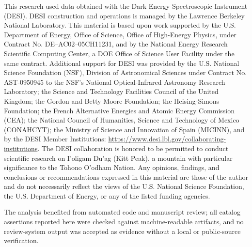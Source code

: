 \documentclass[twocolumn]{aastex701}
\begin{document}
\begin{acknowledgments}
This research used data obtained with the Dark Energy Spectroscopic Instrument (DESI).  DESI
construction and operations is managed by the Lawrence Berkeley National Laboratory.  This
material is based upon work supported by the U.S. Department of Energy, Office of Science,
Office of High-Energy Physics, under Contract No. DE--AC02--05CH11231, and by the National Energy
Research Scientific Computing Center, a DOE Office of Science User Facility under the same
contract.  Additional support for DESI was provided by the U.S. National Science Foundation
(NSF), Division of Astronomical Sciences under Contract No. AST-0950945 to the NSF's National
Optical-Infrared Astronomy Research Laboratory; the Science and Technology Facilities Council
of the United Kingdom; the Gordon and Betty Moore Foundation; the Heising-Simons Foundation;
the French Alternative Energies and Atomic Energy Commission (CEA); the National Council of
Humanities, Science and Technology of Mexico (CONAHCYT); the Ministry of Science and Innovation
of Spain (MICINN), and by the DESI Member Institutions:
\url{https://www.desi.lbl.gov/collaborating-institutions}.  The DESI collaboration is honored to
be permitted to conduct scientific research on I'oligam Du'ag (Kitt Peak), a mountain with
particular significance to the Tohono O'odham Nation.  Any opinions, findings, and conclusions
or recommendations expressed in this material are those of the author and do not necessarily
reflect the views of the U.S. National Science Foundation, the U.S. Department of Energy, or
any of the listed funding agencies.

The analysis benefited from automated code and manuscript review; all catalog assertions
reported here were checked against machine-readable artifacts, and no review-system output was
accepted as evidence without a local or public-source verification.
\end{acknowledgments}
\end{document}
